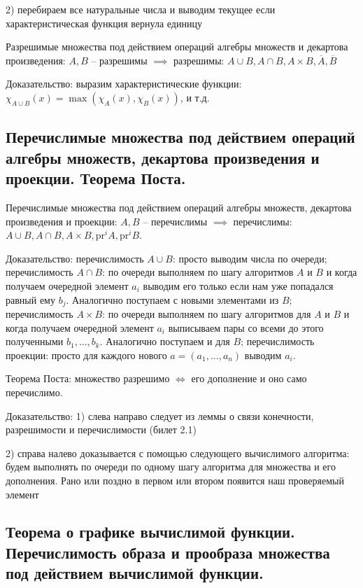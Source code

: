 \documentclass[a4paper, 10pt]{article}
\begin{document}
2) перебираем все натуральные числа и выводим текущее если характеристическая функция вернула единицу

\hfill

Разрешимые множества под действием операций алгебры множеств и декартова произведения: $A,B$ -- разрешимы $\implies$ разрешимы: $A\cup B, A\cap B, A\times B, \overline{A}, \overline{B}$

Доказательство: выразим характеристические функции: $\chi_{A\cup B}(x)=\max(\chi_A(x),\chi_B(x))$, и т.д.

\subsection{Перечислимые множества под действием операций алгебры множеств, декартова произведения и проекции. Теорема Поста.}

Перечислимые множества под действием операций алгебры множеств, декартова произведения и проекции: $A,B$ -- перечислимы $\implies$ перечислимы: $A\cup B, A\cap B, A\times B, \text{pr}^i A, \text{pr}^i B$.

Доказательство: перечислимость $A\cup B$: просто выводим числа по очереди; перечислимость $A\cap B$: по очереди выполняем по шагу алгоритмов $A$ и $B$ и когда получаем очередной элемент $a_i$ выводим его только если нам уже попадался равный ему $b_j$. Аналогично поступаем с новыми элементами из $B$; перечислимость $A\times B$: по очереди выполняем по шагу алгоритмов для $A$ и $B$ и когда получаем очередной элемент $a_i$ выписываем пары со всеми до этого полученными $b_1,\ldots,b_k$. Аналогично поступаем и для $B$; перечислимость проекции: просто для каждого нового $a=(a_1,\ldots,a_n)$ выводим $a_i$.

\hfill

Теорема Поста: множество разрешимо $\iff$ его дополнение и оно само перечислимо.

Доказательство: 1) слева направо следует из леммы о связи конечности, разрешимости и перечислимости (билет 2.1)

2) справа налево доказывается с помощью следующего вычислимого алгоритма: будем выполнять по очереди по одному шагу алгоритма для множества и его дополнения. Рано или поздно в первом или втором появится наш проверяемый элемент

\subsection{Теорема о графике вычислимой функции. Перечислимость образа и прообраза множества под действием вычислимой функции.}
\end{document}
